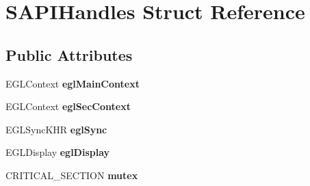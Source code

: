 \hypertarget{struct_s_a_p_i_handles}{\section{S\+A\+P\+I\+Handles Struct Reference}
\label{struct_s_a_p_i_handles}
}
\subsection*{Public Attributes}
\begin{DoxyCompactItemize}
\item 
\hypertarget{struct_s_a_p_i_handles_a345209d480f9de44e242ec99f957da1f}{E\+G\+L\+Context {\bfseries egl\+Main\+Context}}\label{struct_s_a_p_i_handles_a345209d480f9de44e242ec99f957da1f}

\item 
\hypertarget{struct_s_a_p_i_handles_abb82fe5813343f0c8420fef0cb178b88}{E\+G\+L\+Context {\bfseries egl\+Sec\+Context}}\label{struct_s_a_p_i_handles_abb82fe5813343f0c8420fef0cb178b88}

\item 
\hypertarget{struct_s_a_p_i_handles_a503d972604ef279c64fb74867b4c9e46}{E\+G\+L\+Sync\+K\+H\+R {\bfseries egl\+Sync}}\label{struct_s_a_p_i_handles_a503d972604ef279c64fb74867b4c9e46}

\item 
\hypertarget{struct_s_a_p_i_handles_a9588cc97d5b034687dd01d05036ce547}{E\+G\+L\+Display {\bfseries egl\+Display}}\label{struct_s_a_p_i_handles_a9588cc97d5b034687dd01d05036ce547}

\item 
\hypertarget{struct_s_a_p_i_handles_a26efb33ece5c168e1e7929b7f43964ed}{C\+R\+I\+T\+I\+C\+A\+L\+\_\+\+S\+E\+C\+T\+I\+O\+N {\bfseries mutex}}\label{struct_s_a_p_i_handles_a26efb33ece5c168e1e7929b7f43964ed}

\end{DoxyCompactItemize}

